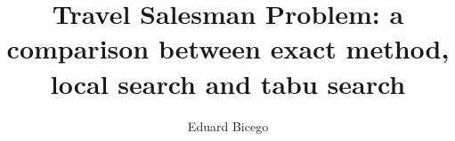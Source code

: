 \documentclass[]{article}
\title{Travel Salesman Problem: a comparison between exact method, local search and tabu search}
\author{Eduard Bicego}
\begin{document}
\maketitle

\begin{abstract}

\end{abstract}







\end{document}
